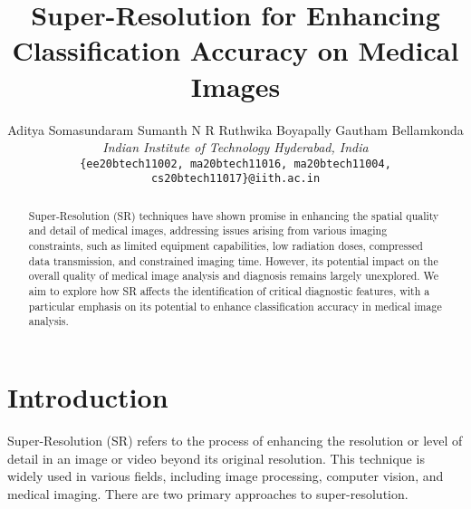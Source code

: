 \documentclass[10pt,twocolumn,letterpaper]{article}
\begin{document}
\title{Super-Resolution for Enhancing Classification Accuracy on Medical Images}

\author{Aditya Somasundaram \qquad Sumanth N R \qquad Ruthwika Boyapally \qquad Gautham Bellamkonda\\
\textit{Indian Institute of Technology Hyderabad, India}\\
{\tt\small \{ee20btech11002, ma20btech11016, ma20btech11004, cs20btech11017\}@iith.ac.in}
}

\maketitle

\begin{abstract}
   Super-Resolution (SR) techniques have shown promise in enhancing the spatial quality and detail of medical images, addressing issues arising from various imaging constraints, such as limited equipment capabilities, low radiation doses, compressed data transmission, and constrained imaging time. However, its potential impact on the overall quality of medical image analysis and diagnosis remains largely unexplored. We aim to explore how SR affects the identification of critical diagnostic features, with a particular emphasis on its potential to enhance classification accuracy in medical image analysis.
\end{abstract}

\section{Introduction}
\label{sec:intro}

Super-Resolution (SR) refers to the process of enhancing the resolution or level of detail in an image or video beyond its original resolution. This technique is widely used in various fields, including image processing, computer vision, and medical imaging. There are two primary approaches to super-resolution.
\end{document}
